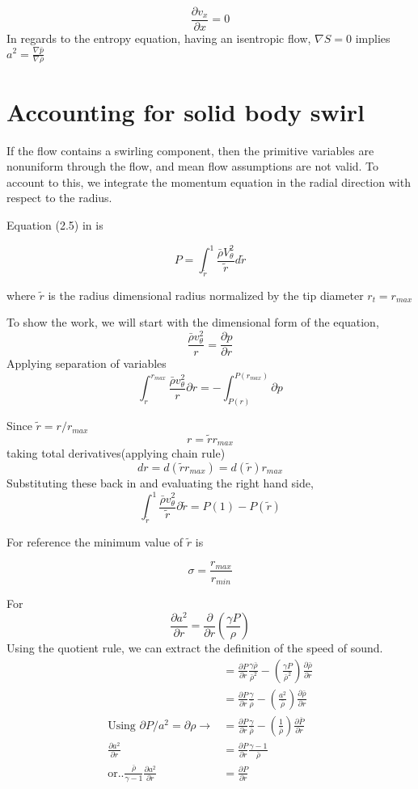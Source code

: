 \[ \frac{\partial v_x}{\partial x} = 0 \]
In regards to the entropy equation, having an isentropic flow, $\nabla S = 0$ implies $a^2= \frac{\nabla \bar{p}}{ \nabla \bar{\rho}}$ 


\section{Accounting for solid body swirl}

If the flow contains a swirling component, then the primitive variables are nonuniform through the flow, and mean flow assumptions are not valid. To account to this, we integrate the momentum equation in the radial direction with respect to the radius. 

Equation (2.5) in \cite{Kousen1999} is 

\[P = \int_{\tilde{r}}^{1} \frac{\bar{\rho} V_{\theta}^2}{\tilde{r}} d\tilde{r}\] 

where $\tilde{r}$ is the radius dimensional radius normalized by the tip diameter $r_t = r_{max}$

To show the work, we will start with the dimensional form of the equation,
\[
\frac{\bar{\rho} v_{\theta}^2}{r} 
=\frac{\partial p}{\partial r}
\]
Applying separation of variables
\[
\int_{r}^{r_{max}} \frac{\bar{\rho} v_{\theta}^2}{r}\partial r 
=-\int_{P(r)}^{P(r_{max})}\partial p
\]

Since $\tilde{r} = r/r_{max}$
\[r = \tilde{r}r_{max}\]
taking total derivatives(applying chain rule)
\[dr = d(\tilde{r}r_{max}) = d(\tilde{r})r_{max}\]
Substituting these back in and evaluating the right hand side,
\[
\int_{\tilde{r}}^{1} \frac{\bar{\rho} v_{\theta}^2}{\tilde{r}}\partial \tilde{r} 
=P(1)-P(\tilde{r})
\]

For reference the minimum value of $\tilde{r}$ is

\[\sigma = \frac{r_{max}}{r_{min}}\]

For 
\[\frac{\partial a^2}{\partial r } = \frac{\partial}{\partial r} \left( \frac{\gamma P}{\rho} \right)\]
Using the quotient rule, we can extract the definition of the speed of sound.
\begin{align*}
&= \frac{\partial P}{\partial r} \frac{\gamma \bar{\rho}}{\bar{\rho}^2} - \left( \frac{\gamma P}{\bar{\rho}^2} \right) \frac{\partial \bar{\rho}}{\partial r}\\
&=  \frac{\partial P}{\partial r} \frac{\gamma }{\bar{\rho}} - \left( \frac{a^2}{\bar{\rho}} \right) \frac{\partial \bar{\rho} }{\partial r}\\ \text{Using } \partial P/a^2 = \partial \rho \rightarrow &= \frac{\partial P}{\partial r} \frac{\gamma }{\bar{\rho}} - \left( \frac{1}{\bar{\rho}} \right) \frac{\partial \bar{ P} }{\partial r}\\
\frac{\partial a^2}{\partial r} &= \frac{\partial P}{\partial r} \frac{\gamma - 1}{\bar{\rho}}  \\ \text{or..}
\frac{\bar{\rho}}{\gamma -1}\frac{\partial a^2}{\partial r} &= \frac{\partial P}{\partial r} 
\end{align*}


